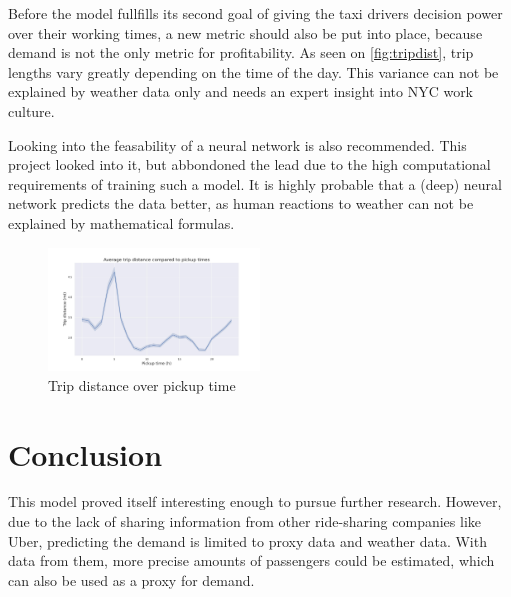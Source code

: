 \documentclass[11pt]{article}
\begin{document}
Before the model fullfills its second goal of giving the taxi drivers decision power over their working times, a new metric should also be put into place, because demand is not the only metric for profitability. As seen on \autoref{fig:tripdist}, trip lengths vary greatly depending on the time of the day. This variance can not be explained by weather data only and needs an expert insight into NYC work culture.

Looking into the feasability of a neural network is also recommended. This project looked into it, but abbondoned the lead due to the high computational requirements of training such a model. It is highly probable that a (deep) neural network predicts the data better, as human reactions to weather can not be explained by mathematical formulas.



\begin{figure}[h]
    \includegraphics[width=0.5\textwidth]{pickuptime_distance.jpeg}
    \centering
    \caption{Trip distance over pickup time} \label{fig:tripdist}%
\end{figure}

\section{Conclusion}

This model proved itself interesting enough to pursue further research. However, due to the lack of sharing information from other ride-sharing companies like Uber, predicting the demand is limited to proxy data and weather data. With data from them, more precise amounts of passengers could be estimated, which can also be used as a proxy for demand.


\clearpage

\printbibliography
\end{document}
